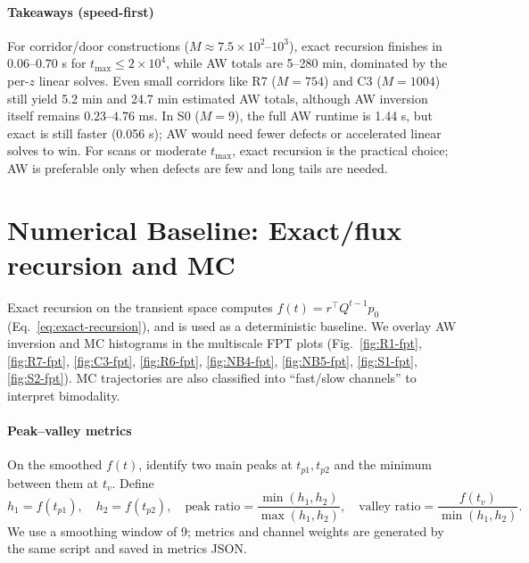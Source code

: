 \documentclass[11pt]{article}
\begin{document}
\paragraph{Takeaways (speed-first)}
For corridor/door constructions ($M\approx 7.5\times 10^2$--$10^3$), exact recursion finishes in $0.06$--$0.70$ s for $t_{\max}\le 2\times 10^4$, while AW totals are 5--280 min, dominated by the per-$z$ linear solves. Even small corridors like R7 ($M=754$) and C3 ($M=1004$) still yield 5.2 min and 24.7 min estimated AW totals, although AW inversion itself remains $0.23$--$4.76$ ms. In S0 ($M=9$), the full AW runtime is 1.44 s, but exact is still faster (0.056 s); AW would need fewer defects or accelerated linear solves to win. For scans or moderate $t_{\max}$, exact recursion is the practical choice; AW is preferable only when defects are few and long tails are needed.

\section{Numerical Baseline: Exact/flux recursion and MC}
Exact recursion on the transient space computes $f(t)=r^\top Q^{t-1} p_0$ (Eq.~\ref{eq:exact-recursion}), and is used as a deterministic baseline. We overlay AW inversion and MC histograms in the multiscale FPT plots (Fig.~\ref{fig:R1-fpt}, \ref{fig:R7-fpt}, \ref{fig:C3-fpt}, \ref{fig:R6-fpt}, \ref{fig:NB4-fpt}, \ref{fig:NB5-fpt}, \ref{fig:S1-fpt}, \ref{fig:S2-fpt}). MC trajectories are also classified into ``fast/slow channels'' to interpret bimodality.

\paragraph{Peak--valley metrics}
On the smoothed $f(t)$, identify two main peaks at $t_{p1},t_{p2}$ and the minimum between them at $t_v$. Define
\begin{equation}
  h_1=f(t_{p1}),\quad h_2=f(t_{p2}),\quad
  \text{peak ratio}=\frac{\min(h_1,h_2)}{\max(h_1,h_2)},\quad
  \text{valley ratio}=\frac{f(t_v)}{\min(h_1,h_2)}.
\end{equation}
We use a smoothing window of 9; metrics and channel weights are generated by the same script and saved in metrics JSON.
\end{document}
